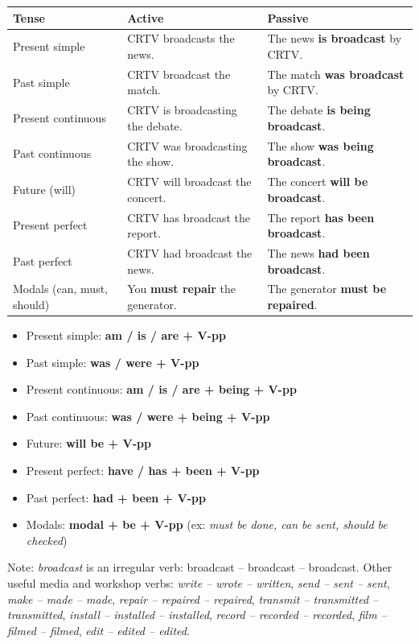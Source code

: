 \documentclass[11pt]{article}
\begin{document}
\begin{center}
\begin{tabularx}{\linewidth}{|l|X|X|}
\hline
\rowcolor{popblueL} \textbf{Tense} & \textbf{Active} & \textbf{Passive} \\
\hline
Present simple & CRTV broadcasts the news. & The news \textbf{is broadcast} by CRTV. \\
\hline
Past simple & CRTV broadcast the match. & The match \textbf{was broadcast} by CRTV. \\
\hline
Present continuous & CRTV is broadcasting the debate. & The debate \textbf{is being broadcast}. \\
\hline
Past continuous & CRTV was broadcasting the show. & The show \textbf{was being broadcast}. \\
\hline
Future (will) & CRTV will broadcast the concert. & The concert \textbf{will be broadcast}. \\
\hline
Present perfect & CRTV has broadcast the report. & The report \textbf{has been broadcast}. \\
\hline
Past perfect & CRTV had broadcast the news. & The news \textbf{had been broadcast}. \\
\hline
Modals (can, must, should) & You \textbf{must repair} the generator. & The generator \textbf{must be repaired}. \\
\hline
\end{tabularx}
\end{center}

\begin{aretenir}
\begin{itemize}
\item Present simple: \textbf{am / is / are + V-pp}
\item Past simple: \textbf{was / were + V-pp}
\item Present continuous: \textbf{am / is / are + being + V-pp}
\item Past continuous: \textbf{was / were + being + V-pp}
\item Future: \textbf{will be + V-pp}
\item Present perfect: \textbf{have / has + been + V-pp}
\item Past perfect: \textbf{had + been + V-pp}
\item Modals: \textbf{modal + be + V-pp} (ex: \emph{must be done, can be sent, should be checked})
\end{itemize}
Note: \emph{broadcast} is an irregular verb: broadcast -- broadcast -- broadcast. Other useful media and workshop verbs: \emph{write -- wrote -- written}, \emph{send -- sent -- sent}, \emph{make -- made -- made}, \emph{repair -- repaired -- repaired}, \emph{transmit -- transmitted -- transmitted}, \emph{install -- installed -- installed}, \emph{record -- recorded -- recorded}, \emph{film -- filmed -- filmed}, \emph{edit -- edited -- edited}.
\end{aretenir}
\end{document}
